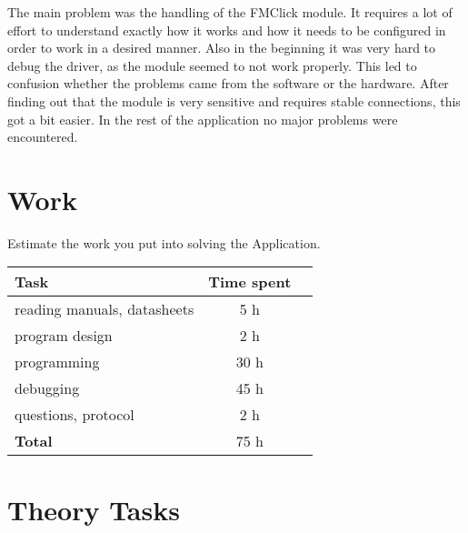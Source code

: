 \documentclass[12pt,a4paper,titlepage,oneside]{article}
\begin{document}
The main problem was the handling of the FMClick module. It 
requires a lot of effort to understand exactly how it works and how it needs
to be configured in order to work in a desired manner. Also in the beginning
it was very hard to debug the driver, as the module seemed to not work properly.
This led to confusion whether the problems came from the software or the hardware.
After finding out that the module is very sensitive and requires stable connections,
this got a bit easier. In the rest of the application no major problems were
encountered.

\section{Work}

Estimate the work you put into solving the Application.

\begin{tabular}{|l|c|c|}\hline
	Task & Time spent \\ \hline

	reading manuals, datasheets &  5 h\\
	program design              &  2 h\\
	programming                 & 30 h\\
	debugging                   & 45 h\\
	questions, protocol         &  2 h\\ \hline

	\textbf{Total}              & 75 h\\ \hline
\end{tabular}

\section{Theory Tasks}







\newpage
\end{document}
